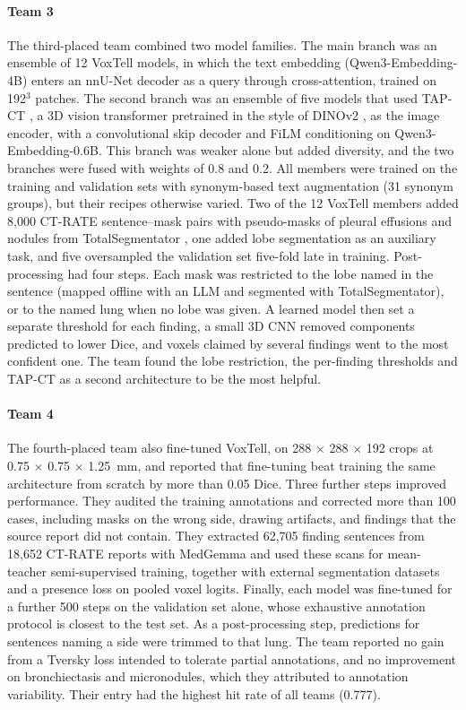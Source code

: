 \documentclass[final,5p,times,twocolumn,authoryear,numafflabel]{elsarticle}
\begin{document}
\paragraph{Team 3} The third-placed team combined two model
families. The main branch was an ensemble of 12 VoxTell models, in which
the text embedding (Qwen3-Embedding-4B) enters an nnU-Net decoder as a query
through cross-attention, trained on 192$^3$ patches. The second branch
was an ensemble of five models that used TAP-CT \citep{veenboer2025tap}, a 3D
vision transformer pretrained in the style of DINOv2 \citep{oquab2023dinov2},
as the image encoder, with a convolutional skip decoder and FiLM conditioning on
Qwen3-Embedding-0.6B. This branch was weaker alone but added diversity, and the
two branches were fused with weights of 0.8 and 0.2. All members were trained on the training and validation sets
with synonym-based text augmentation (31 synonym groups), but their recipes
otherwise varied. Two of the 12 VoxTell members added 8,000 CT-RATE
sentence--mask pairs with pseudo-masks of pleural effusions and nodules from
TotalSegmentator \citep{wasserthal2023totalsegmentator}, one added lobe
segmentation as an auxiliary task, and five oversampled the validation set
five-fold late in training. Post-processing had four steps. Each mask was
restricted to the lobe named in the sentence (mapped offline with an LLM and
segmented with TotalSegmentator), or to the named lung when no lobe was given.
A learned model then set a separate threshold for each finding, a small 3D CNN
removed components predicted to lower Dice, and voxels claimed by several
findings went to the most confident one. The team found the lobe restriction,
the per-finding thresholds and TAP-CT as a second architecture to be the most
helpful.

\paragraph{Team 4} The fourth-placed team also fine-tuned
VoxTell, on 288 $\times$ 288 $\times$ 192 crops at 0.75 $\times$ 0.75
$\times$ 1.25~mm, and reported that fine-tuning beat training the same
architecture from scratch by more than 0.05 Dice. Three further steps
improved performance. They audited the training annotations and corrected more
than 100 cases, including masks on the wrong side, drawing artifacts,
and findings that the source report did not contain. They extracted
62,705 finding sentences from 18,652 CT-RATE reports with MedGemma
\citep{sellergren2026open} and used these scans for mean-teacher
semi-supervised training, together with external segmentation datasets and a
presence loss on pooled voxel logits. Finally, each model was fine-tuned for
a further 500 steps on the validation set alone, whose exhaustive
annotation protocol is closest to the test set. As a post-processing step,
predictions for sentences naming a side were trimmed to that lung. The team reported no gain from a Tversky loss
intended to tolerate partial annotations, and no improvement on
bronchiectasis and micronodules, which they attributed to annotation
variability. Their entry had the highest hit rate of all teams
(0.777).
\end{document}
